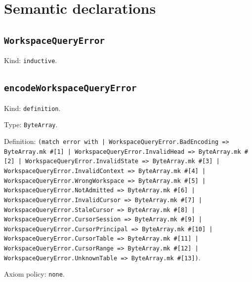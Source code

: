 \documentclass[11pt]{article}
\begin{document}
\section*{Semantic declarations}
\subsection*{\texttt{WorkspaceQueryError}}
\noindent Kind: \texttt{inductive}.\par
\subsection*{\texttt{encodeWorkspaceQueryError}}
\noindent Kind: \texttt{definition}.\par
\noindent Type: \texttt{ByteArray}.\par
\noindent Definition: \texttt{(match error with | WorkspaceQueryError.BadEncoding => ByteArray.mk \#[1] | WorkspaceQueryError.InvalidHead => ByteArray.mk \#[2] | WorkspaceQueryError.InvalidState => ByteArray.mk \#[3] | WorkspaceQueryError.InvalidContext => ByteArray.mk \#[4] | WorkspaceQueryError.WrongWorkspace => ByteArray.mk \#[5] | WorkspaceQueryError.NotAdmitted => ByteArray.mk \#[6] | WorkspaceQueryError.InvalidCursor => ByteArray.mk \#[7] | WorkspaceQueryError.StaleCursor => ByteArray.mk \#[8] | WorkspaceQueryError.CursorSession => ByteArray.mk \#[9] | WorkspaceQueryError.CursorPrincipal => ByteArray.mk \#[10] | WorkspaceQueryError.CursorTable => ByteArray.mk \#[11] | WorkspaceQueryError.CursorRange => ByteArray.mk \#[12] | WorkspaceQueryError.UnknownTable => ByteArray.mk \#[13])}.\par
\noindent Axiom policy: \texttt{none}.\par
\end{document}
